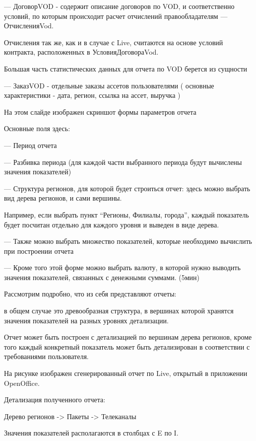 \documentclass[a4paper]{article}
\begin{document}
--- ДоговорVOD - содержит описание договоров по VOD, и соответственно условий, по которым происходит 
расчет отчислений правообладателям --- ОтчисленияVod.

Отчисления так же, как и в случае с Live, считаются на основе условий контракта, расположенных в УсловияДоговораVod.

\newpage

Большая часть статистических данных для отчета по VOD берется из сущности

--- ЗаказVOD - отдельные заказы ассетов пользователями ( основные характеристики - дата, регион, ссылка на ассет, выручка )

\newpage
На этом слайде изображен скриншот формы параметров отчета

Основные поля здесь:

--- Период отчета

--- Разбивка периода (для каждой части выбранного периода будут вычислены значения показателей)

\newpage
--- Структура регионов, для которой будет строиться отчет: здесь можно выбрать вид дерева регионов, и сами вершины.

Например, если выбрать пункт “Регионы, Филиалы, города”, каждый показатель будет посчитан отдельно для каждого уровня и выведен в виде дерева.


\newpage
--- Также можно выбрать множество показателей, которые необходимо вычислить при построении отчета

--- Кроме того этой форме можно выбрать валюту, в которой нужно выводить значения показателей, связанных с денежными суммами.
(5мин)

\newpage
Рассмотрим подробно, что из себя представляют отчеты:

в общем случае это древообразная структура, в вершинах которой хранятся значения показателей
на разных уровнях детализации.

Отчет может быть построен с детализацией 
по вершинам дерева регионов, кроме того каждый конкретный показатель может быть детализирован
в соответствии с требованиями пользователя.

\newpage
На рисунке изображен сгенерированный отчет по Live, открытый в приложении OpenOffice.

Детализация полученного отчета:

Дерево регионов -> Пакеты -> Телеканалы

Значения показателей располагаются в столбцах с E по I.
\end{document}
